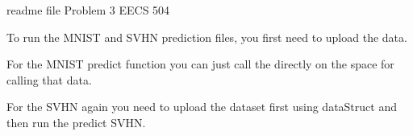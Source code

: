 readme file Problem 3 EECS 504	

To run the MNIST and SVHN prediction files, you first need to upload the data.

For the MNIST predict function you can just call the directly on the space for calling that data.

For the SVHN again you need to upload the dataset first using dataStruct and then run the predict SVHN.
